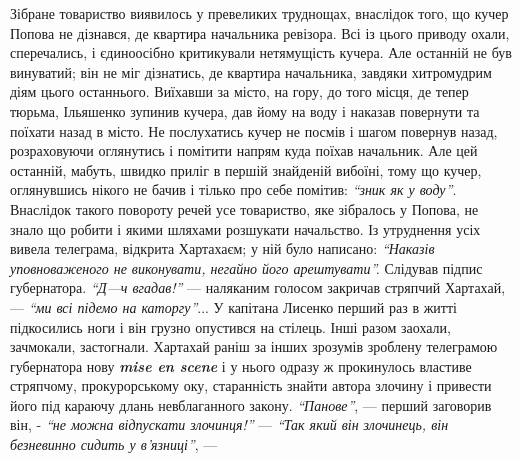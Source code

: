 \documentclass[a4paper,20pt]{report}
\begin{document}
Зібране товариство виявилось у превеликих труднощах, внаслідок того, що кучер Попова не дізнався,
де квартира начальника ревізора. Всі із цього приводу охали, сперечались, і єдиноосібно критикували
нетямущість кучера. Але останній не був винуватий; він не міг дізнатись, де квартира начальника, завдяки
хитромудрим діям цього останнього. Виїхавши за місто, на гору, до того місця, де тепер тюрьма, Ільяшенко
зупинив кучера, дав йому на воду і наказав повернути та поїхати назад в місто. Не послухатись
кучер не посмів і шагом повернув назад, розраховуючи оглянутись і помітити напрям куда поїхав начальник.
Але цей останній, мабуть, швидко приліг в першій знайденій вибоїні, тому що кучер, оглянувшись
нікого не бачив і тілько про себе помітив: \emph{``зник як у воду''}. Внаслідок такого повороту речей усе товариство,
яке зібралось у Попова, не знало що робити і якими шляхами розшукати начальство. Із утруднення
усіх вивела телеграма, відкрита Хартахаєм; у ній було написано:
\emph{``Наказів уповноваженого не виконувати, негайно його арештувати''.} 
Слідував підпис губернатора.  \emph{``Д—ч вгадав!''} — наляканим голосом закричав стряпчий Хартахай, — \emph{``ми
всі підемо на каторгу''}... У капітана Лисенко перший раз в житті підкосились ноги і він грузно 
опустився на стілець. Інші разом заохали, зачмокали, застогнали. Хартахай раніш за інших зрозумів
зроблену телеграмою губернатора нову \textbf{\em mise en scene} і у нього одразу ж прокинулось
властиве стряпчому, прокурорському оку, старанність знайти автора злочину і привести його під караючу длань
невблаганного закону. \emph{``Панове''}, — перший заговорив він, - 
\emph{``не можна відпускати злочинця!''} — \emph{``Так який він злочинець, він безневинно сидить у в'язниці''}, —
\end{document}
